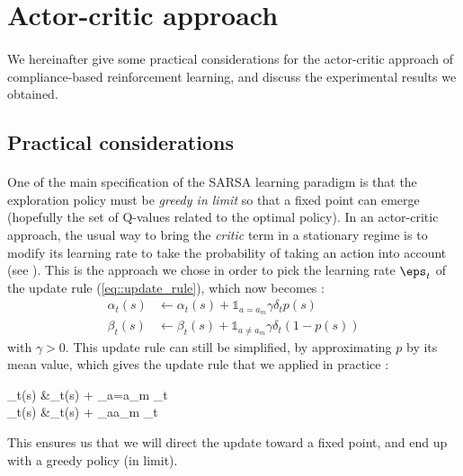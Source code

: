 \documentclass[a4paper]{report}
\begin{document}
{{		\section{Actor-critic approach}
		{
			\paragraph{} We hereinafter give some practical considerations for the actor-critic approach of compliance-based reinforcement learning, and discuss the experimental results we obtained. 
			\subsection{Practical considerations}
			{
				\paragraph{} One of the main specification of the SARSA learning paradigm is that the exploration policy must be \emph{greedy in limit} so that a fixed point can emerge (hopefully the set of Q-values related to the optimal policy). In an actor-critic approach, the usual way to bring the \emph{critic} term in a stationary regime is to modify its learning rate to take the probability of taking an action into account (see \cite{Sutton98a}). \newline
				This is the approach we chose in order to pick the learning rate $\eps_t$ of the update rule (\ref{eq::update_rule}), which now becomes : 
			\begin{equation}
				\begin{aligned}
					\alpha_t(s) &\leftarrow \alpha_t(s) +  \mathds{1}_{a=a_m}\gamma \delta_t p(s)\\
					\beta_t(s) &\leftarrow \beta_t(s) +   \mathds{1}_{a\neq a_m}\gamma \delta_t (1-p(s))
				\end{aligned}
			\end{equation}
			with $\gamma >0$. This update rule can still be simplified, by approximating $p$ by its mean value, which gives the update rule that we applied in practice : 
			{
				\begin{aligned}
					\alpha_t(s) &\leftarrow \alpha_t(s) +  _{a=a_m} \delta_t \\
					\beta_t(s) &\leftarrow \beta_t(s) +   _{a\neq a_m}  \delta_t
				\end{aligned}
			}
			This ensures us that we will direct the update toward a fixed point, and end up with a greedy policy (in limit). 
			
}}}}
\end{document}
